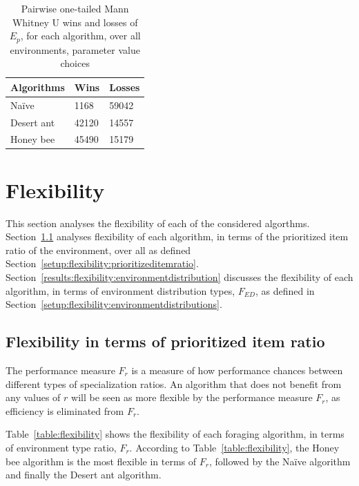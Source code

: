 \begin{table}[]
\centering
\caption{Pairwise one-tailed Mann Whitney U wins and losses of $E_p$, for each algorithm, over all environments, parameter value choices }
\label{summarytable}
\begin{tabular}{@{}lll@{}}
\toprule
\textbf{Algorithms} & \textbf{Wins} & \textbf{Losses} \\ \midrule
Na\"ive               & 1168          & 59042           \\
Desert ant          & 42120         & 14557           \\
Honey bee           & 45490         & 15179           \\ \bottomrule
\end{tabular}
\end{table}

\section{Flexibility}
\label{results:flexibility}

This section analyses the flexibility of each of the considered algorthms. Section~\ref{results:prioritizeditemratio} analyses flexibility of each algorithm, in terms of the prioritized item ratio of the environment, over all  as defined Section~\ref{setup:flexibility:prioritizeditemratio}. Section~\ref{results:flexibility:environmentdistribution} discusses the flexibility of each algorithm, in terms of environment distribution types, $F_{ED}$, as defined in Section~\ref{setup:flexibility:environmentdistributions}.

\subsection{Flexibility in terms of prioritized item ratio}
\label{results:prioritizeditemratio}

The performance measure $F_r$ is a measure of how performance chances between different types of specialization ratios. An algorithm that does not benefit from any values of $r$ will be seen as more flexible by the performance measure $F_r$, as efficiency is eliminated from $F_r$.

Table~\ref{table:flexibility} shows the flexibility of each foraging algorithm, in terms of environment type ratio, $F_r$. According to Table~\ref{table:flexibility}, the Honey bee algorithm is the most flexible in terms of $F_r$, followed by the Na\"ive algorithm and finally the Desert ant algorithm. 

